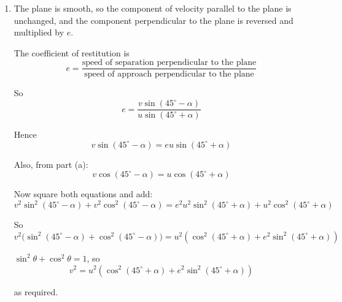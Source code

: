 \documentclass[leqno]{article}
\begin{document}
\begin{enumerate}[
  label=\textbf{\arabic*.},
  leftmargin=*,
  topsep=0pt,
  partopsep=0pt,
  parsep=0pt
]
\begin{djsSolution}
\begin{enumerate}[label=\textbf{(\alph*)}]
where \(\mathbf{u}\) and \(\mathbf{v}\) are the velocities of \(P\) before and after the impact. Taking components perpendicular to the plane, the magnitude of the impulse is
\[
I=m\left(v\sin(45^\circ-\alpha)-(-u\sin(45^\circ+\alpha))\right)
\]
\[
I=m\left(v\sin(45^\circ-\alpha)+u\sin(45^\circ+\alpha)\right)
\]

Now use \(\sin(45^\circ+\alpha)=\cos(45^\circ-\alpha)\) and \(v=u\tan(45^\circ-\alpha)\):
\begin{align*}
I&=m\left(u\tan(45^\circ-\alpha)\sin(45^\circ-\alpha)+u\cos(45^\circ-\alpha)\right) \\
&=mu\left(\frac{\sin^2(45^\circ-\alpha)}{\cos(45^\circ-\alpha)}+\cos(45^\circ-\alpha)\right) \\
&=mu\left(\frac{\sin^2(45^\circ-\alpha)+\cos^2(45^\circ-\alpha)}{\cos(45^\circ-\alpha)}\right) \\
&=mu\sec(45^\circ-\alpha)
\end{align*}

By Newton's third law, the impulse exerted on the plane by \(P\) has the same magnitude.

Hence the magnitude of the impulse exerted on the plane by \(P\) is
\[
mu\sec(45^\circ-\alpha)
\]

\item The plane is smooth, so the component of velocity parallel to the plane is unchanged, and the component perpendicular to the plane is reversed and multiplied by \(e\).

The coefficient of restitution is
\[
e=\dfrac{\text{speed of separation perpendicular to the plane}}{\text{speed of approach perpendicular to the plane}}
\]

So
\[
e=\frac{v\sin(45^\circ-\alpha)}{u\sin(45^\circ+\alpha)}
\]

Hence
\[
v\sin(45^\circ-\alpha)=eu\sin(45^\circ+\alpha)
\]

Also, from part (a):
\[
v\cos(45^\circ-\alpha)=u\cos(45^\circ+\alpha)
\]

Now square both equations and add:
\[
v^2\sin^2(45^\circ-\alpha)+v^2\cos^2(45^\circ-\alpha)
=e^2u^2\sin^2(45^\circ+\alpha)+u^2\cos^2(45^\circ+\alpha)
\]

So
\[
v^2\bigl(\sin^2(45^\circ-\alpha)+\cos^2(45^\circ-\alpha)\bigr)
=u^2\left(\cos^2(45^\circ+\alpha)+e^2\sin^2(45^\circ+\alpha)\right)
\]

\(\sin^2\theta+\cos^2\theta=1\), so
\[
v^2=u^2\left(\cos^2(45^\circ+\alpha)+e^2\sin^2(45^\circ+\alpha)\right)
\]

as required.


\end{enumerate}
\end{djsSolution}
\end{enumerate}
\end{document}

